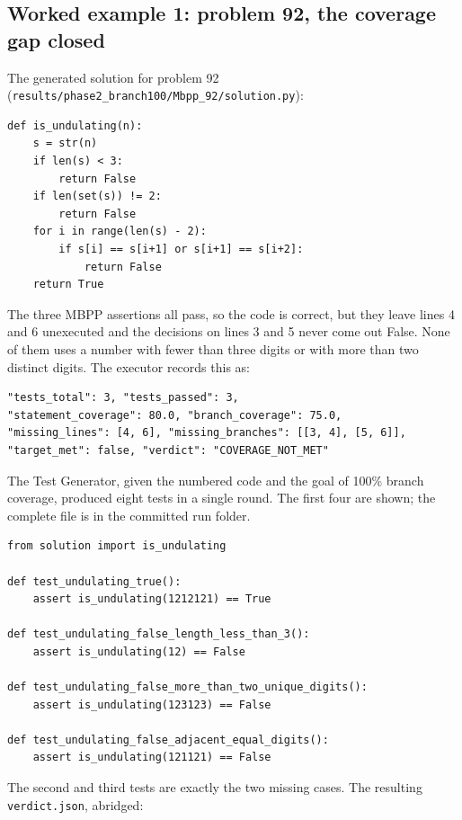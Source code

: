 \documentclass[11pt,a4paper]{article}
\begin{document}
\subsection{Worked example 1: problem 92, the coverage gap closed}

The generated solution for problem 92 (\texttt{results/phase2\_branch100/Mbpp\_92/solution.py}):

\begin{lstlisting}[style=py]
def is_undulating(n):
    s = str(n)
    if len(s) < 3:
        return False
    if len(set(s)) != 2:
        return False
    for i in range(len(s) - 2):
        if s[i] == s[i+1] or s[i+1] == s[i+2]:
            return False
    return True
\end{lstlisting}

The three MBPP assertions all pass, so the code is correct, but they leave lines 4 and 6 unexecuted and the
decisions on lines 3 and 5 never come out False. None of them uses a number with fewer than three digits or
with more than two distinct digits. The executor records this as:

\begin{lstlisting}[style=plain]
"tests_total": 3, "tests_passed": 3,
"statement_coverage": 80.0, "branch_coverage": 75.0,
"missing_lines": [4, 6], "missing_branches": [[3, 4], [5, 6]],
"target_met": false, "verdict": "COVERAGE_NOT_MET"
\end{lstlisting}

The Test Generator, given the numbered code and the goal of 100\% branch coverage, produced eight tests in a
single round. The first four are shown; the complete file is in the committed run folder.

\begin{lstlisting}[style=py]
from solution import is_undulating

def test_undulating_true():
    assert is_undulating(1212121) == True

def test_undulating_false_length_less_than_3():
    assert is_undulating(12) == False

def test_undulating_false_more_than_two_unique_digits():
    assert is_undulating(123123) == False

def test_undulating_false_adjacent_equal_digits():
    assert is_undulating(121121) == False
\end{lstlisting}

The second and third tests are exactly the two missing cases. The resulting \texttt{verdict.json}, abridged:
\end{document}
